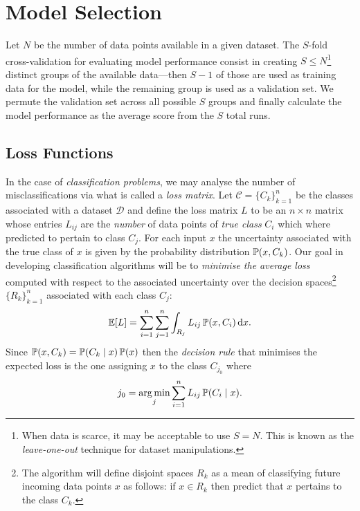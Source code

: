 \section{Model Selection}

\begin{definition}
    \label{def:s-fold-cross-validation}
    Let \(N\) be the number of data points available in a given dataset. The
    \(S\)-fold cross-validation for evaluating model performance consist in creating
    \(S \leq N\)\footnote{When data is scarce, it may be acceptable to use
        \(S = N\). This is known as the \emph{leave-one-out} technique for dataset
        manipulations.} distinct groups of the available data---then \(S-1\) of those
    are used as training data for the model, while the remaining group is used as a
    validation set. We permute the validation set across all possible \(S\) groups
    and finally calculate the model performance as the average score from the \(S\)
    total runs.
\end{definition}

\subsection{Loss Functions}

In the case of \emph{classification problems}, we may analyse the number of
misclassifications via what is called a \emph{loss matrix}. Let
\(\mathcal{C} = \{C_k\}_{k=1}^n\) be the classes associated with a dataset
\(\mathcal{D}\) and define the loss matrix \(L\) to be an \(n \times n\) matrix
whose entries \(L_{i j}\) are the \emph{number} of data points of \emph{true
    class} \(C_i\) which where predicted to pertain to class \(C_j\). For each
input \(x\) the uncertainty associated with the true class of \(x\) is given by
the probability distribution \(\operatorname{\mathbb{P}}(x, C_k)\). Our goal in developing
classification algorithms will be to \emph{minimise the average loss} computed
with respect to the associated uncertainty over the decision spaces\footnote{The
    algorithm will define disjoint spaces \(R_k\) as a mean of classifying future
    incoming data points \(x\) as follows: if \(x \in R_k\) then predict that \(x\)
    pertains to the class \(C_k\).}
\(\{R_k\}_{k=1}^n\) associated with each class \(C_j\):
\[
    \operatorname{\mathbb{E}}[L] = \sum_{i=1}^n \sum_{j=1}^n \int_{R_j} L_{i j} \operatorname{\mathbb{P}}(x, C_i)\, \mathrm{d} x.
\]
Since \(\operatorname{\mathbb{P}}(x, C_k) = \operatorname{\mathbb{P}}(C_k \mid x) \operatorname{\mathbb{P}}(x)\) then the \emph{decision
    rule} that minimises the expected loss is the one assigning \(x\) to the class
\(C_{j_0}\) where
\[
    j_0 = \operatorname*{arg\,min}_j \sum_{i=1}^n L_{i j} \operatorname{\mathbb{P}}(C_i \mid x).
\]

